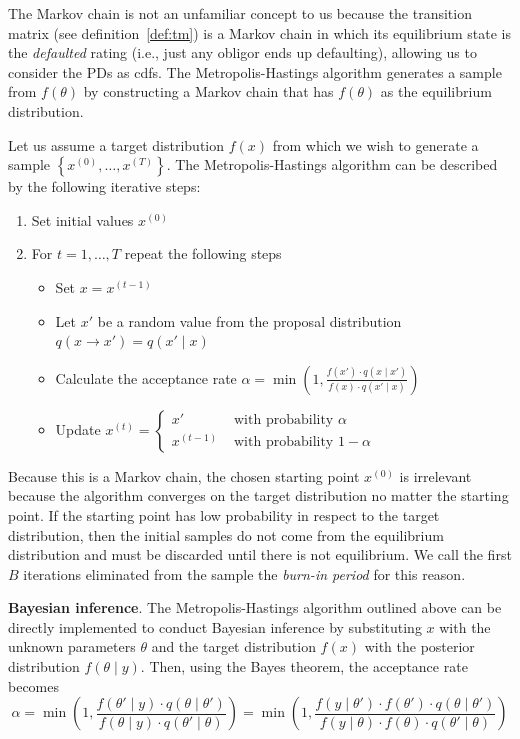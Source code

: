 \documentclass[11pt,fleqn]{book} %
\begin{document}
The Markov chain is not an unfamiliar concept to us because the transition 
matrix (see definition~\ref{def:tm}) is a Markov chain in which its 
equilibrium state is the \emph{defaulted} rating (i.e., just any 
obligor ends up defaulting), allowing us to consider the PDs as cdfs.
The Metropolis-Hastings algorithm generates a sample from $f(\theta)$ 
by constructing a Markov chain that has $f(\theta)$ as the equilibrium 
distribution.

\begin{algorithm}
	Let us assume a target distribution $f(x)$ from which we wish to 
	generate a sample $\left\{x^{(0)},\dots,x^{(T)}\right\}$. The 
	Metropolis-Hastings algorithm can be described by the following 
	iterative steps:
	\begin{enumerate}
		\item Set initial values $x^{(0)}$
		\item For $t=1,\dots,T$ repeat the following steps
		\begin{itemize}
			\item Set $x=x^{(t-1)}$
			\item Let $x'$ be a random value from the proposal distribution 
			$q(x \to x')=q(x' \mid x)$
			\item Calculate the acceptance rate 
			$\alpha = \min\left(1,\frac{f(x') \cdot q(x \mid x')}{f(x) \cdot q(x' \mid x)}\right)$
			\item Update $x^{(t)}=\left\{
			\begin{array}{ll}
				x'        & \text{ with probability } \alpha   \\
				x^{(t-1)} & \text{ with probability } 1-\alpha 
			\end{array}\right.$ 
		\end{itemize}
	\end{enumerate}
\end{algorithm}

Because this is a Markov chain, the chosen starting point $x^{(0)}$ is 
irrelevant because the algorithm converges on the target distribution
no matter the starting point. If the starting point has low probability 
in respect to the target distribution, then the initial samples do not 
come from the equilibrium distribution and must be discarded until there 
is not equilibrium. We call the first $B$ iterations eliminated from the 
sample the \emph{burn-in period} for this reason.

\textbf{Bayesian inference}.
The Metropolis-Hastings algorithm outlined above can be directly implemented 
to conduct Bayesian inference by substituting $x$ with the unknown parameters 
$\theta$ and the target distribution $f(x)$ with the posterior distribution 
$f(\theta \mid y)$. Then, using the Bayes theorem, the acceptance rate 
becomes
\begin{displaymath}
	\alpha = \min\left(1,\frac{f(\theta' \mid y) \cdot q(\theta \mid \theta')}{f(\theta \mid y) \cdot q(\theta' \mid \theta)}\right) = \min\left(1,\frac{f(y \mid \theta') \cdot f(\theta') \cdot q(\theta \mid \theta')}{f(y \mid \theta)  \cdot f(\theta) \cdot q(\theta' \mid \theta)}\right)
\end{displaymath}
\end{document}

